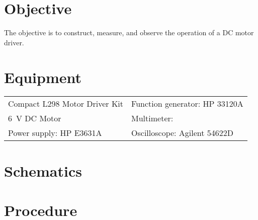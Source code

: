 

\section{Objective}
\label{sec:objective}

The objective is to construct, measure, and observe the operation of a DC motor driver.

\section{Equipment}
\label{sec:equipment}

\begin{tabular}{ll}
  \centering
  Compact L298 Motor Driver Kit & Function generator: HP 33120A \\
  \SI{6}{V} DC Motor            & Multimeter:        \\
  Power supply: HP E3631A       & Oscilloscope: Agilent 54622D  \\
\end{tabular}

\section{Schematics}
\label{sec:schematics}


\section{Procedure}
\label{sec:procedure}

